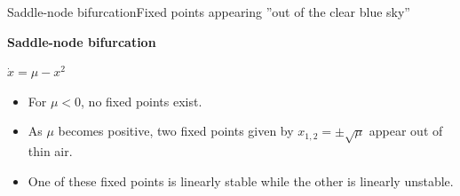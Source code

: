 \documentclass[usenames,dvipsnames,svgnames,10pt,aspectratio=169]{beamer}
\begin{document}
\begin{frame}[t, c]{Saddle-node bifurcation}{Fixed points appearing ''out of the clear blue sky''}
  \begin{minipage}{.48\textwidth}
    \begin{block}{\centering \alert{\textbf{Saddle-node bifurcation}}}
      \centering

      \medskip

      \( \dot{x} = \mu - x^2 \)
    \end{block}

    \bigskip

    \begin{itemize}
    \item For $\mu < 0$, no fixed points exist.

      \medskip

    \item As $\mu$ becomes positive, two fixed points given by $x_{1, 2} = \pm \sqrt{\mu}$ appear out of thin air.

      \medskip

    \item One of these fixed points is linearly stable while the other is linearly unstable.
    \end{itemize}
  \end{minipage}%
  \hfill
  \begin{minipage}{.48\textwidth}
    \centering
  \end{minipage}

  \vspace{1cm}
\end{frame}
\end{document}
